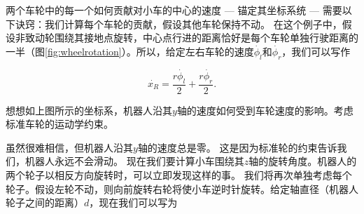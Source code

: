 
两个车轮中的每一个如何贡献对小车的中心的速度 --- 锚定其坐标系统 --- 需要以下诀窍：我们计算每个车轮的贡献，假设其他车轮保持不动。 在这个例子中，假设非致动轮围绕其接地点旋转，中心点行进的距离恰好是每个车轮单独行驶距离的一半（图\ref{fig:wheelrotation}）。所以，给定左右车轮的速度$\dot{\phi_l}$和$\dot{\phi_r}$，我们可以写作

\begin{equation}
\dot{x_R}=\frac{r\dot{\phi_l}}{2}+\frac{r\dot{\phi_r}}{2}.
\end{equation}


\begin{framed}
想想如上图所示的坐标系，机器人沿其$y$轴的速度如何受到车轮速度的影响。考虑标准车轮的运动学约束。
\end{framed}


虽然很难相信，但机器人沿其$y$轴的速度总是零。 这是因为标准轮的约束告诉我们，机器人永远不会滑动。 现在我们要计算小车围绕其$z$轴的旋转角度。机器人的两个轮子以相反方向旋转时，可以立即发现这样的事。 我们将再次单独考虑每个轮子。假设左轮不动，则向前旋转右轮将使小车逆时针旋转。给定轴直径（机器人轮子之间的距离）$ d $，现在我们可以写为

